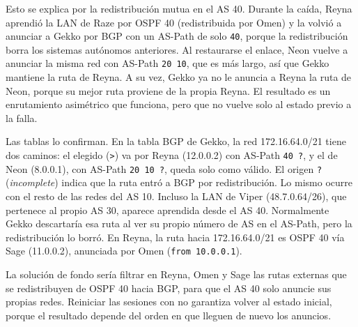 Esto se explica por la redistribución mutua en el AS 40. Durante la caída, Reyna aprendió la LAN de Raze por OSPF 40 (redistribuida por Omen) y la volvió a anunciar a Gekko por BGP con un AS-Path de solo \texttt{40}, porque la redistribución borra los sistemas autónomos anteriores. Al restaurarse el enlace, Neon vuelve a anunciar la misma red con AS-Path \texttt{20 10}, que es más largo, así que Gekko mantiene la ruta de Reyna. A su vez, Gekko ya no le anuncia a Reyna la ruta de Neon, porque su mejor ruta proviene de la propia Reyna. El resultado es un enrutamiento asimétrico que funciona, pero que no vuelve solo al estado previo a la falla.

Las tablas lo confirman. En la tabla BGP de Gekko, la red 172.16.64.0/21 tiene dos caminos: el elegido (\texttt{>}) va por Reyna (12.0.0.2) con AS-Path \texttt{40 ?}, y el de Neon (8.0.0.1), con AS-Path \texttt{20 10 ?}, queda solo como válido. El origen \texttt{?} (\textit{incomplete}) indica que la ruta entró a BGP por redistribución. Lo mismo ocurre con el resto de las redes del AS 10. Incluso la LAN de Viper (48.7.0.64/26), que pertenece al propio AS 30, aparece aprendida desde el AS 40. Normalmente Gekko descartaría esa ruta al ver su propio número de AS en el AS-Path, pero la redistribución lo borró. En Reyna, la ruta hacia 172.16.64.0/21 es OSPF 40 vía Sage (11.0.0.2), anunciada por Omen (\texttt{from 10.0.0.1}).


La solución de fondo sería filtrar en Reyna, Omen y Sage las rutas externas que se redistribuyen de OSPF 40 hacia BGP, para que el AS 40 solo anuncie sus propias redes. Reiniciar las sesiones con  no garantiza volver al estado inicial, porque el resultado depende del orden en que lleguen de nuevo los anuncios.

